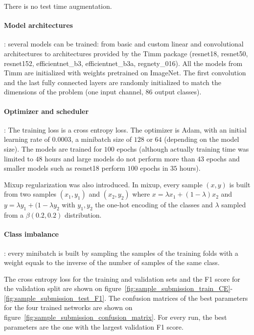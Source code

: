 \documentclass{article}
\begin{document}
There is no test time augmentation.

\paragraph{Model architectures}: several models can be trained: from basic and custom linear and convolutional architectures to architectures provided by the Timm package (resnet18, resnet50, resnet152, efficientnet\_b3, efficientnet\_b3a, regnety\_016). All the models from Timm are initialized with weights pretrained on ImageNet. The first convolution and the last fully connected layers are randomly initialized to match the dimensions of the problem (one input channel, 86 output classes).


\paragraph{Optimizer and scheduler}: The training loss is a cross entropy loss. The optimizer is Adam, with an initial learning rate of $0.0003$, a minibatch size of $128$ or $64$ (depending on the model size). The models are trained for $100$ epochs (although actually training time was limited to $48$ hours and large models do not perform more than $43$ epochs and smaller models such as resnet18 perform $100$ epochs in $35$ hours). 

Mixup regularization was also introduced. In mixup, every sample $(x, y)$ is built from two samples $(x_1, y_1)$ and $(x_2,y_2)$ where $x = \lambda x_1 + (1-\lambda)x_2$ and $y = \lambda y_1 + (1-\lambda y_2$ with $y_1, y_2$ the one-hot encoding of the classes and $\lambda$ sampled from a $\beta(0.2, 0.2)$ distribution.

\paragraph{Class imbalance}: every minibatch is built by sampling the samples of the training folds with a weight equals to the inverse of the number of samples of the same class.

The cross entropy loss for the training and validation sets and the F1 score for the validation split are shown on figure~\ref{fig:sample_submission_train_CE}-\ref{fig:sample_submission_test_F1}. The confusion matrices of the best parameters for the four trained networks are shown on figure~\ref{fig:sample_submission_confusion_matrix}. For every run, the best parameters are the one with the largest validation F1 score. 
\end{document}
